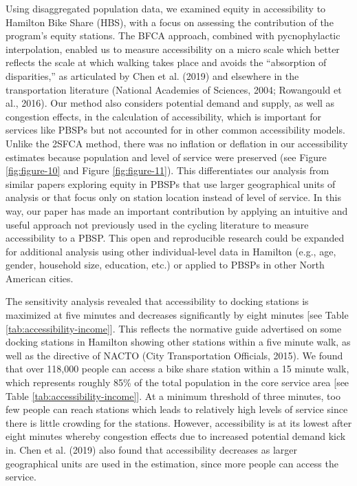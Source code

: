 \documentclass[]{elsarticle} %
\begin{document}
Using disaggregated population data, we examined equity in accessibility
to Hamilton Bike Share (HBS), with a focus on assessing the contribution
of the program's equity stations. The BFCA approach, combined with
pycnophylactic interpolation, enabled us to measure accessibility on a
micro scale which better reflects the scale at which walking takes place
and avoids the ``absorption of disparities,'' as articulated by Chen et
al. (2019) and elsewhere in the transportation literature (National
Academies of Sciences, 2004; Rowangould et al., 2016). Our method also
considers potential demand and supply, as well as congestion effects, in
the calculation of accessibility, which is important for services like
PBSPs but not accounted for in other common accessibility models. Unlike
the 2SFCA method, there was no inflation or deflation in our
accessibility estimates because population and level of service were
preserved (see Figure \ref{fig:figure-10} and Figure
\ref{fig:figure-11}). This differentiates our analysis from similar
papers exploring equity in PBSPs that use larger geographical units of
analysis or that focus only on station location instead of level of
service. In this way, our paper has made an important contribution by
applying an intuitive and useful approach not previously used in the
cycling literature to measure accessibility to a PBSP. This open and
reproducible research could be expanded for additional analysis using
other individual-level data in Hamilton (e.g., age, gender, household
size, education, etc.) or applied to PBSPs in other North American
cities.

The sensitivity analysis revealed that accessibility to docking stations
is maximized at five minutes and decreases significantly by eight
minutes {[}see Table \ref{tab:accessibility-income}{]}. This reflects
the normative guide advertised on some docking stations in Hamilton
showing other stations within a five minute walk, as well as the
directive of NACTO (City Transportation Officials, 2015). We found that
over 118,000 people can access a bike share station within a 15 minute
walk, which represents roughly 85\% of the total population in the core
service area {[}see Table \ref{tab:accessibility-income}{]}. At a
minimum threshold of three minutes, too few people can reach stations
which leads to relatively high levels of service since there is little
crowding for the stations. However, accessibility is at its lowest after
eight minutes whereby congestion effects due to increased potential
demand kick in. Chen et al. (2019) also found that accessibility
decreases as larger geographical units are used in the estimation, since
more people can access the service.
\end{document}
